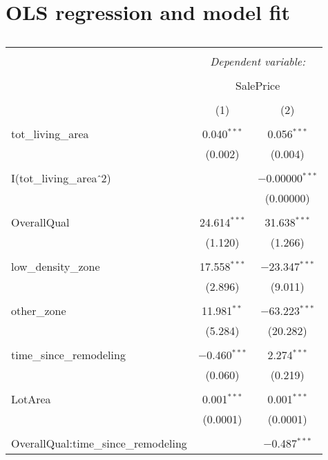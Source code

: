 \documentclass{article}
\begin{document}
\section{OLS regression and model fit}

\begin{table}[!htbp] \centering 
  \caption{} 
  \label{} 
\begin{tabular}{@{\extracolsep{5pt}}lcc} 
\\[-1.8ex]\hline 
\hline \\[-1.8ex] 
 & \multicolumn{2}{c}{\textit{Dependent variable:}} \\ 
\cline{2-3} 
\\[-1.8ex] & \multicolumn{2}{c}{SalePrice} \\ 
\\[-1.8ex] & (1) & (2)\\ 
\hline \\[-1.8ex] 
 tot\_living\_area & 0.040$^{***}$ & 0.056$^{***}$ \\ 
  & (0.002) & (0.004) \\ 
  & & \\ 
 I(tot\_living\_area$\hat{\mkern6mu}$2) &  & $-$0.00000$^{***}$ \\ 
  &  & (0.00000) \\ 
  & & \\ 
 OverallQual & 24.614$^{***}$ & 31.638$^{***}$ \\ 
  & (1.120) & (1.266) \\ 
  & & \\ 
 low\_density\_zone & 17.558$^{***}$ & $-$23.347$^{***}$ \\ 
  & (2.896) & (9.011) \\ 
  & & \\ 
 other\_zone & 11.981$^{**}$ & $-$63.223$^{***}$ \\ 
  & (5.284) & (20.282) \\ 
  & & \\ 
 time\_since\_remodeling & $-$0.460$^{***}$ & 2.274$^{***}$ \\ 
  & (0.060) & (0.219) \\ 
  & & \\ 
 LotArea & 0.001$^{***}$ & 0.001$^{***}$ \\ 
  & (0.0001) & (0.0001) \\ 
  & & \\ 
 OverallQual:time\_since\_remodeling &  & $-$0.487$^{***}$ \\ 

\end{tabular}
\end{table}
\end{document}
